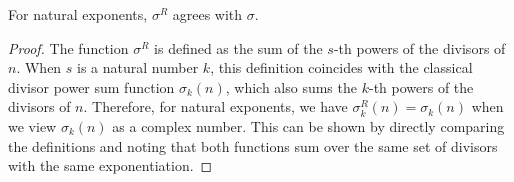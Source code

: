 \begin{theorem}
\label{sigmaR_natCast}
\leanok
For natural exponents, $\sigma^R$ agrees with $\sigma$.
\end{theorem}
\begin{proof}
\leanok
The function $\sigma^R$ is defined as the sum of the $s$-th powers of the divisors of $n$. When
  $s$ is a natural number $k$, this definition coincides with the classical divisor power sum
  function $\sigma_k(n)$, which also sums the $k$-th powers of the divisors of $n$. Therefore, for
  natural exponents, we have $\sigma^R_k(n) = \sigma_k(n)$ when we view $\sigma_k(n)$ as a complex
  number. This can be shown by directly comparing the definitions and noting that both functions sum
  over the same set of divisors with the same exponentiation.
\end{proof}
